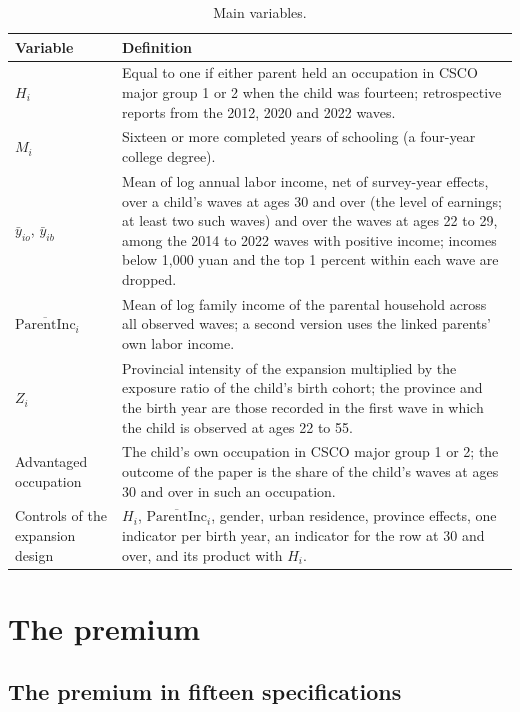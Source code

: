 \documentclass[11pt]{article}
\numberwithin{equation}{section}
\newcommand{\pinc}{\overline{\mathrm{ParentInc}}}
\begin{document}
\begin{table}[H]
\centering
\small
\caption{Main variables.}
\label{oatab:vars}
\begin{tabular}{@{}L{3.6cm}L{11.0cm}@{}}
\toprule
Variable & Definition \\
\midrule
$H_i$ & Equal to one if either parent held an occupation in CSCO major
group 1 or 2 when the child was fourteen; retrospective reports from the
2012, 2020 and 2022 waves. \\
$M_i$ & Sixteen or more completed years of schooling (a four-year
college degree). \\
$\bar y_{io}$, $\bar y_{ib}$ & Mean of log annual labor income, net of
survey-year effects, over a child's waves at ages 30 and over (the
level of earnings; at least two such waves) and over the waves at ages
22 to 29, among the 2014 to 2022 waves with positive income; incomes
below 1,000 yuan and the top 1 percent within each wave are dropped. \\
$\pinc_i$ & Mean of log family income of the parental household across
all observed waves; a second version uses the linked parents' own labor
income. \\
$Z_{i}$ & Provincial intensity of the expansion multiplied by the
exposure ratio of the child's birth cohort; the province and the birth year are those recorded in the first wave in which the child is observed at ages 22 to 55. \\
Advantaged occupation & The child's own occupation in CSCO major
group 1 or 2; the outcome of the paper is the share of the child's
waves at ages 30 and over in such an occupation. \\
Controls of the expansion design & $H_i$, $\pinc_i$, gender, urban
residence, province effects, one indicator per birth year, an indicator
for the row at 30 and over, and its product with $H_i$. \\
\bottomrule
\end{tabular}
\end{table}

\section{The premium}
\label{oa:premium}



\subsection{The premium in fifteen specifications}
\label{oa:spec}
\end{document}
